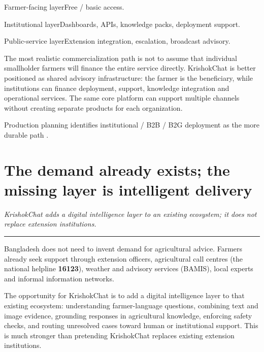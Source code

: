 \documentclass[11pt,a4paper]{article}
\newcommand{\takeaway}[1]{{\color{kcgrey}\itshape\large #1}\par\vspace{2pt}%
  {\color{kcline}\rule{\linewidth}{0.8pt}}\par\vspace{6pt}}
\newcommand{\srcfoot}[1]{\par\vspace{4pt}{\color{kcline}\rule{\linewidth}{0.4pt}}\par
  {\footnotesize\color{kcgrey}#1}\par}
\begin{document}
\begin{minipage}[t]{0.32\linewidth}
\begin{card}{Farmer-facing layer}\footnotesize Free / basic access.\end{card}
\end{minipage}\hfill
\begin{minipage}[t]{0.32\linewidth}
\begin{card}{Institutional layer}\footnotesize Dashboards, APIs, knowledge packs, deployment support.\end{card}
\end{minipage}\hfill
\begin{minipage}[t]{0.32\linewidth}
\begin{card}{Public-service layer}\footnotesize Extension integration, escalation, broadcast advisory.\end{card}
\end{minipage}

\vspace{5pt}
The most realistic commercialization path is not to assume that individual
smallholder farmers will finance the entire service directly. KrishokChat is
better positioned as shared advisory infrastructure: the farmer is the
beneficiary, while institutions can finance deployment, support, knowledge
integration and operational services. The same core platform can support multiple
channels without creating separate products for each organization.

\srcfoot{Production planning identifies institutional / B2B / B2G deployment as the more durable path \cite{krishokchat_repo}.}

\newpage
\section*{\color{kcgreen}The demand already exists; the missing layer is intelligent delivery}
\takeaway{KrishokChat adds a digital intelligence layer to an existing ecosystem; it does not replace extension institutions.}

Bangladesh does not need to invent demand for agricultural advice. Farmers already
seek support through extension officers, agricultural call centres (the national
helpline \textbf{16123}), weather and advisory services (BAMIS), local experts and
informal information networks.

\vspace{4pt}
The opportunity for KrishokChat is to add a digital intelligence layer to that
existing ecosystem: understanding farmer-language questions, combining text and
image evidence, grounding responses in agricultural knowledge, enforcing safety
checks, and routing unresolved cases toward human or institutional support. This
is much stronger than pretending KrishokChat replaces existing extension
institutions.
\end{document}
